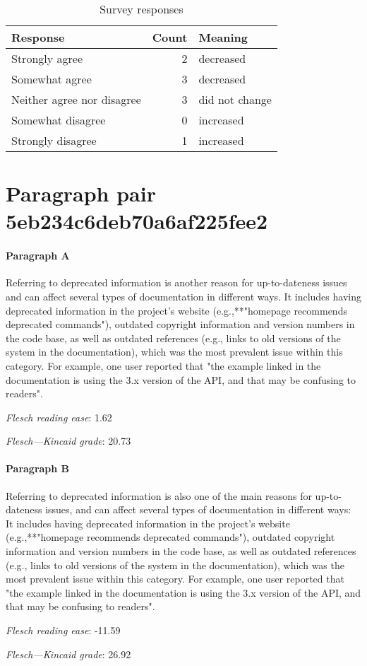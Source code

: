 \begin{table}[!h]
\centering
\begin{tabular}{lrl}
\toprule
          \textbf{Response} &  \textbf{Count} & \textbf{Meaning} \\
\midrule
             Strongly agree &               2 &        decreased \\
             Somewhat agree &               3 &        decreased \\
 Neither agree nor disagree &               3 &   did not change \\
          Somewhat disagree &               0 &        increased \\
          Strongly disagree &               1 &        increased \\
\bottomrule
\end{tabular}
\caption*{Survey responses}\end{table}


\newpage
\section{Paragraph pair 5eb234c6deb70a6af225fee2}
\paragraph{Paragraph A}
Referring to deprecated information is another reason for up-to-dateness issues and can affect several types of documentation in different ways. It includes having deprecated information in the project's website (e.g.,**"homepage recommends deprecated commands"), outdated copyright information and version numbers in the code base, as well as outdated references (e.g., links to old versions of the system in the documentation), which was the most prevalent issue within this category. For example, one user reported that "the example linked in the documentation is using the 3.x version of the API, and that may be confusing to readers".\par\medskip
\emph{Flesch reading ease}: 1.62\par
\emph{Flesch---Kincaid grade}: 20.73

\paragraph{Paragraph B}
Referring to deprecated information is also one of the main reasons for up-to-dateness issues, and can affect several types of documentation in different ways: It includes having deprecated information in the project's website (e.g.,**"homepage recommends deprecated commands"), outdated copyright information and version numbers in the code base, as well as outdated references (e.g., links to old versions of the system in the documentation), which was the most prevalent issue within this category. For example, one user reported that "the example linked in the documentation is using the 3.x version of the API, and that may be confusing to readers".\par\medskip
\emph{Flesch reading ease}: -11.59\par
\emph{Flesch---Kincaid grade}: 26.92

